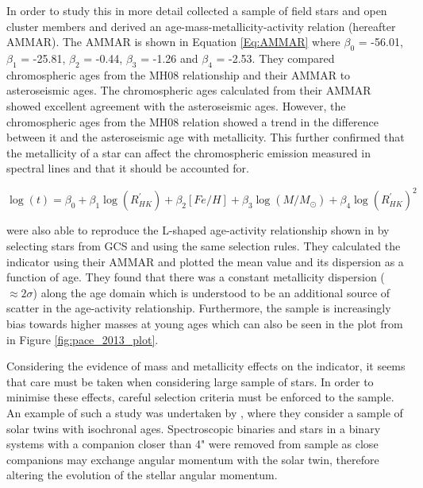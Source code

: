 In order to study this in more detail \citet{Lorenzo_Oliveira_etal_2016} collected a sample of field stars and open cluster members and derived an age-mass-metallicity-activity relation (hereafter AMMAR). The AMMAR is shown in Equation \ref{Eq:AMMAR} where $\beta_{0}$ = -56.01, $\beta_{1}$ = -25.81, $\beta_{2}$ = -0.44, $\beta_{3}$ = -1.26 and $\beta_{4}$ = -2.53. They compared chromospheric ages from the MH08 relationship and their AMMAR to asteroseismic ages. The chromospheric ages calculated from their AMMAR showed excellent agreement with the asteroseismic ages. However, the chromospheric ages from the MH08 relation showed a trend in the difference between it and the asteroseismic age with metallicity. This further confirmed that the metallicity of a star can affect the chromospheric emission measured in \caII spectral lines and that it should be accounted for.

\begin{equation}
    \log(t) = \beta_{0} + \beta_{1}\log(R^{'}_{HK}) + \beta_{2}[Fe/H] + \beta_{3}\log(M/M_{\odot}) + \beta_{4}\log(R^{'}_{HK})^{2}
    \label{Eq:AMMAR}
\end{equation}

\citet{Lorenzo_Oliveira_etal_2016} were also able to reproduce the L-shaped age-activity relationship shown in \citet{Pace_2013} by selecting stars from GCS and using the same selection rules. They calculated the \Rprime indicator using their AMMAR and plotted the mean value and its dispersion as a function of age. They found that there was a constant metallicity dispersion ($\approx 2\sigma$) along the age domain which is understood to be an additional source of scatter in the age-activity relationship. Furthermore, the sample is increasingly bias towards higher masses at young ages which can also be seen in the plot from \citet{Pace_2013} in Figure \ref{fig:pace_2013_plot}.

Considering the evidence of mass and metallicity effects on the \Rprime indicator, it seems that care must be taken when considering large sample of stars. In order to minimise these effects, careful selection criteria must be enforced to the sample. An example of such a study was undertaken by \citet{Lorenzo_Oliveira_etal_2018}, where they consider a sample of solar twins with isochronal ages. Spectroscopic binaries and stars in a binary systems with a companion closer than 4" were removed from sample as close companions may exchange angular momentum with the solar twin, therefore altering the evolution of the stellar angular momentum.

